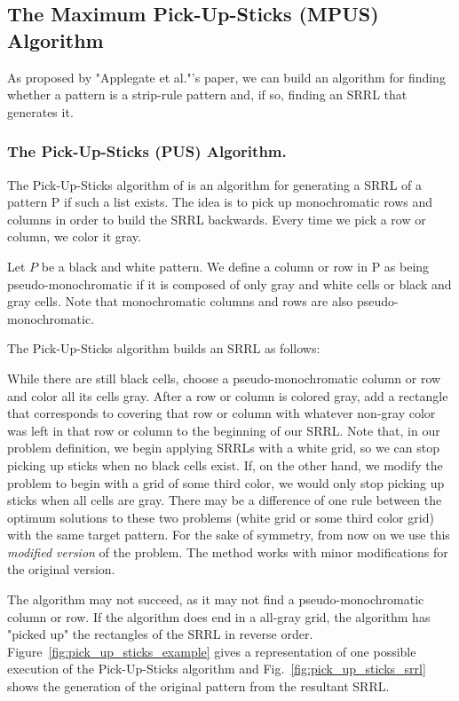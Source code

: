 \subsection{The Maximum Pick-Up-Sticks (MPUS) Algorithm}

As proposed by "Applegate et al."'s paper, we can build an algorithm for finding whether a pattern is a strip-rule pattern and, if so, finding an SRRL that generates it.

\subsubsection{The Pick-Up-Sticks (PUS) Algorithm.}

The Pick-Up-Sticks algorithm of \cite{ACJKLW07}
 is an algorithm for generating a SRRL of a pattern P if such a list exists. The idea is to pick up monochromatic rows and columns in order to build the SRRL backwards. Every time we pick a row or column, we color it gray.

Let $P$ be a black and white pattern. We define a column or row in P as being pseudo-monochromatic if it is composed of only gray and white cells or black and gray cells. Note that monochromatic columns and rows are also pseudo-monochromatic.

The Pick-Up-Sticks algorithm builds an SRRL as follows:

While there are still
black cells, choose a pseudo-monochromatic column or row and color all its cells gray. After a row or column is colored gray, add a rectangle that corresponds to covering that row or column with whatever non-gray color was left in that row or column to the beginning of our SRRL.
Note that, in our problem definition,
 we begin applying SRRLs with a white grid, so we can stop
picking up sticks when no black cells exist.
If, on the other hand, we modify the problem to begin with a grid of some
third color, we would only stop picking up sticks when all cells are gray.
There may be a difference of one rule between the optimum solutions to these two
problems (white grid or some third color grid) with the same target pattern.
For the sake of symmetry, from now on we use this {\em modified version}
of the problem. The method works with minor modifications for
the original version.

The algorithm may not succeed,
as it may not find a pseudo-monochromatic column or row.
If the algorithm does end in a all-gray grid,
the algorithm has "picked up" the rectangles of the SRRL in reverse order. Figure~\ref{fig:pick_up_sticks_example} gives a representation of one possible execution of the Pick-Up-Sticks algorithm and Fig.~\ref{fig:pick_up_sticks_srrl} shows the generation of the original pattern from the resultant SRRL.

